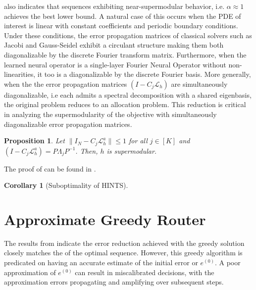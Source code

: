 \documentclass{article} %
\newtheorem{proposition}[theorem]{Proposition}
\newtheorem{corollary}[theorem]{Corollary}
\begin{document}
 also indicates that sequences exhibiting near-supermodular behavior, i.e. $\alpha \approx 1$ achieves the best lower bound. A natural case of this occurs when the PDE of interest is linear with constant coefficients and periodic boundary conditions. Under these conditions, the error propagation matrices of classical solvers such as Jacobi and Gauss-Seidel exhibit a circulant structure making them both diagonalizable by the discrete Fourier transform matrix. Furthermore, when the learned neural operator is a single-layer Fourier Neural Operator without non-linearities, it too is a diagonalizable by the discrete Fourier basis. More generally, when the the error propagation matrices $\left(I - C_j \mathcal{L}_{h}\right)$ are simultaneously diagonalizable, i.e each admits a spectral decomposition with a shared eigenbasis, the original problem reduces to an allocation problem. This reduction is critical in analyzing the supermodularity of the objective with simultaneously diagonalizable error propagation matrices.
\begin{proposition} \label{th:simultaneoussupermodular}
    Let $\|I_N - C_j\mathcal{L}_h^a\| \leq 1$ for all $j \in [K]$ and $\left(I - C_j \mathcal{L}_{h}^a\right) = P\Lambda_jP^{-1}$. Then, $h$ is supermodular. 
\end{proposition}
The proof of  can be found in .



\begin{corollary}[Suboptimality of HINTS]
    
\end{corollary}


\section{Approximate Greedy Router} \label{sec:approxgreedy}

The results from  indicate the error reduction achieved with the  greedy solution closely matches the of the optimal sequence. However, this greedy algorithm is predicated on having an accurate estimate of the initial error or $e^{(0)}$. A poor approximation of $e^{(0)}$ can result in miscalibrated decisions, with the approximation errors propagating and amplifying over subsequent steps. 
\end{document}
